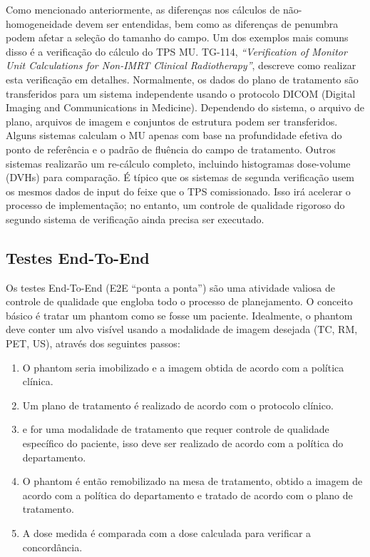 \documentclass[11pt,a4paper]{article}
\newcounter{exemplo}
\begin{document}
	Como mencionado anteriormente, as diferenças nos cálculos de não-homogeneidade devem ser entendidas, bem como as diferenças de penumbra podem afetar a seleção do tamanho do campo. Um dos exemplos mais comuns disso é a verificação do cálculo do TPS MU. TG-114, \textit{``Verification of Monitor Unit Calculations for Non-IMRT Clinical Radiotherapy''}, descreve como realizar esta verificação em detalhes. Normalmente, os dados do plano de tratamento são transferidos para um sistema independente usando o protocolo DICOM (Digital Imaging and Communications in Medicine). Dependendo do sistema, o arquivo de plano, arquivos de imagem e conjuntos de estrutura podem ser transferidos. Alguns sistemas calculam o MU apenas com base na profundidade efetiva do ponto de referência e o padrão de fluência do campo de tratamento. Outros sistemas realizarão um re-cálculo completo, incluindo histogramas dose-volume (DVHs) para comparação. É típico que os sistemas de segunda verificação usem os mesmos dados de input do feixe que o TPS comissionado. Isso irá acelerar o processo de implementação; no entanto, um controle de qualidade rigoroso do segundo sistema de verificação ainda precisa ser executado.

\subsection*{Testes End-To-End}

	Os testes End-To-End (E2E ``ponta a ponta'')  são uma atividade valiosa de controle de qualidade que engloba todo o processo de planejamento. O conceito básico é tratar um phantom como se fosse um paciente. Idealmente, o phantom deve conter um alvo visível usando a modalidade de imagem desejada (TC, RM, PET, US), através dos seguintes passos:
	
	\begin{enumerate}[label=\textcolor{CarnationPink}{\arabic*${}^\circ $}]
		\item O phantom seria imobilizado e a imagem obtida de acordo com a política clínica.
		\item Um plano de tratamento é realizado de acordo com o protocolo clínico.
		\item e for uma modalidade de tratamento que requer controle de qualidade específico do paciente, isso deve ser realizado de acordo com a política do departamento.
		\item O phantom é então remobilizado na mesa de tratamento, obtido a imagem de acordo com a política do departamento e tratado de acordo com o plano de tratamento.
		\item A dose medida é comparada com a dose calculada para verificar a concordância.
	\end{enumerate}
\end{document}
